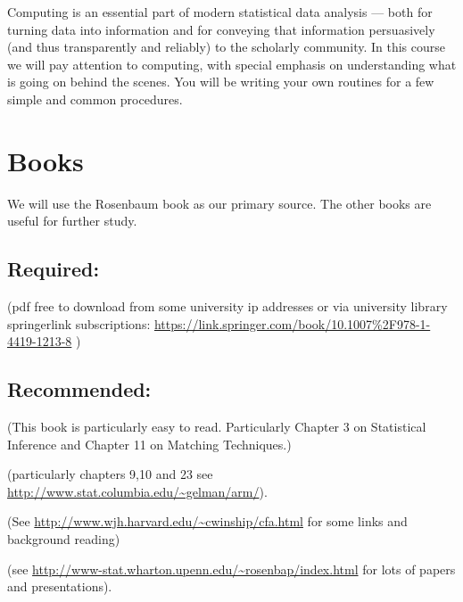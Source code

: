 \documentclass[10pt, letterpaper]{article}
\newenvironment{introstuff} {\setcounter{secnumdepth}{0}%
} {\setcounter{secnumdepth}{1}%
\restoregeometry
}
\begin{document}
\begin{introstuff}
  Computing is an essential part of modern statistical data analysis ---
  both for turning data into information and for conveying that information
  persuasively (and thus transparently and reliably) to the scholarly
  community. In this course we will pay attention to computing, with special
  emphasis on understanding what is going on behind the scenes. You will
  be writing your own routines for a few simple and common procedures.

  \section{Books}\vspace{-2em}
  \nobibliography*

  We will use the Rosenbaum book as our primary source. The other books are useful for further study.


  \subsection{Required:}
   (pdf free to download from some
  university  ip addresses or via university library springerlink
  subscriptions:
  \url{https://link.springer.com/book/10.1007%2F978-1-4419-1213-8}
  )

  \subsection{Recommended:}

   (This book is particularly easy to read. Particularly Chapter 3 on Statistical Inference and Chapter 11 on Matching Techniques.)




    (particularly chapters 9,10 and 23 see \url{http://www.stat.columbia.edu/~gelman/arm/}).

   (See \url{http://www.wjh.harvard.edu/~cwinship/cfa.html} for some
  links and background reading)

   (see \url{http://www-stat.wharton.upenn.edu/~rosenbap/index.html} for lots of papers and presentations).


\end{introstuff}
\end{document}
